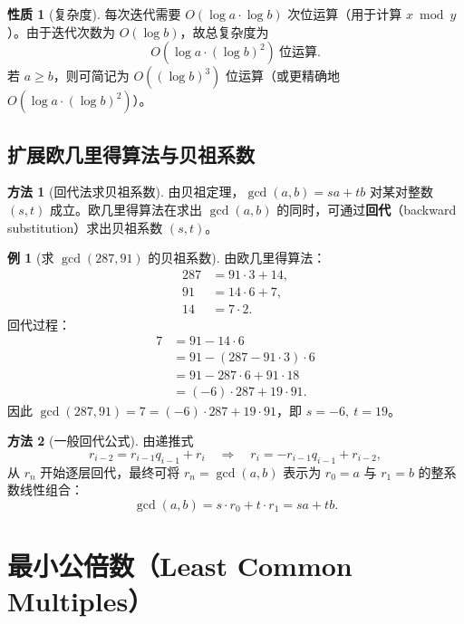 \documentclass[UTF8,11pt,a4paper]{ctexbook}   %
\theoremstyle{definition}
\newtheorem{example}{例}[section]
\newtheorem{property}{性质}[section]
\newtheorem{method}{方法}[section]
\begin{document}
\begin{property}[复杂度]
每次迭代需要 $O(\log a\cdot\log b)$ 次位运算（用于计算 $x\bmod y$）。由于迭代次数为 $O(\log b)$，故总复杂度为
\[
O(\log a\cdot(\log b)^2)\ \text{位运算}.
\]
若 $a\ge b$，则可简记为 $O((\log b)^3)$ 位运算（或更精确地 $O(\log a\cdot(\log b)^2)$）。
\end{property}

\subsection{扩展欧几里得算法与贝祖系数}

\begin{method}[回代法求贝祖系数]
由贝祖定理，$\gcd(a,b)=sa+tb$ 对某对整数 $(s,t)$ 成立。欧几里得算法在求出 $\gcd(a,b)$ 的同时，可通过\textbf{回代}（backward substitution）求出贝祖系数 $(s,t)$。
\end{method}

\begin{example}[求 $\gcd(287,91)$ 的贝祖系数]
由欧几里得算法：
\begin{align*}
287 &= 91\cdot 3 + 14,\\
91 &= 14\cdot 6 + 7,\\
14 &= 7\cdot 2.
\end{align*}
回代过程：
\begin{align*}
7 &= 91 - 14\cdot 6\\
&= 91 - (287 - 91\cdot 3)\cdot 6\\
&= 91 - 287\cdot 6 + 91\cdot 18\\
&= (-6)\cdot 287 + 19\cdot 91.
\end{align*}
因此 $\gcd(287,91)=7=(-6)\cdot 287 + 19\cdot 91$，即 $s=-6,\ t=19$。
\end{example}

\begin{method}[一般回代公式]
由递推式
\[
r_{i-2}=r_{i-1}q_{i-1}+r_i\quad\Rightarrow\quad r_i=-r_{i-1}q_{i-1}+r_{i-2},
\]
从 $r_n$ 开始逐层回代，最终可将 $r_n=\gcd(a,b)$ 表示为 $r_0=a$ 与 $r_1=b$ 的整系数线性组合：
\[
\gcd(a,b)=s\cdot r_0+t\cdot r_1=sa+tb.
\]
\end{method}

\section{最小公倍数（Least Common Multiples）}
\end{document}
